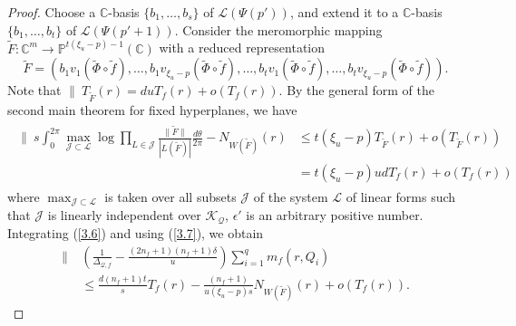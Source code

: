 \documentclass[12pt,leqno]{amsart}
\newcommand{\C}{{\mathbb{C}}}
\numberwithin{equation}{section}
\begin{document}
\begin{proof}
Choose a $\C$-basis $\{b_1,\ldots,b_s\}$ of $\mathcal L(\Psi(p'))$, and extend it to a $\C$-basis $\{b_1,\ldots,b_t\}$ of $\mathcal L(\Psi(p'+1))$.
Consider the meromorphic mapping $\tilde F:\C^m\longrightarrow \mathbb P^{t(\xi_u-p)-1}(\C)$ with a reduced representation
$$\tilde F=(b_1v_1(\tilde\Phi\circ \tilde f),\ldots,b_1v_{\xi_u-p}(\tilde\Phi\circ \tilde f),\ldots, b_tv_1(\tilde\Phi\circ \tilde f),\ldots,b_tv_{\xi_u-p}(\tilde\Phi\circ \tilde f)).$$
Note that $\|\ T_{\tilde F}(r)=duT_f(r)+o(T_f(r))$. By the general form of the second main theorem for fixed hyperplanes, we have
\begin{align}\label{3.7}
\begin{split}
\biggl \|\ s\int_0^{2\pi}\max_{\mathcal J\subset\mathcal L}\log\prod_{L\in\mathcal J}\frac{\|\tilde F\|}{|L(\tilde F)|}\frac{d\theta}{2\pi}-N_{W(\tilde F)}(r)&\le t(\xi_u-p)T_{\tilde F}(r)+o(T_{\tilde F}(r))\\
&=t(\xi_u-p)udT_f(r)+o(T_f(r))
\end{split}
\end{align}
where $\max_{\mathcal J\subset\mathcal L}$ is taken over all subsets $\mathcal J$ of the system $\mathcal L$ of linear forms such that $\mathcal J$ is linearly independent over $\mathcal {K}_{\mathcal {Q}}$, $\epsilon'$ is an arbitrary positive number. Integrating (\ref{3.6}) and using (\ref{3.7}), we obtain
\begin{align*}
\biggl\|\ &\left(\frac{1}{\Delta_{\mathcal Q,f}}-\frac{(2n_f+1)(n_f+1)\delta}{u}\right)\sum_{i=1}^qm_f(r,Q_i)\\
&\le\frac{d(n_f+1)t}{s}T_f(r)-\frac{(n_f+1)}{u(\xi_u-p)s}N_{W(\tilde F)}(r)+o(T_f(r)).
\end{align*}


\end{proof}
\end{document}
